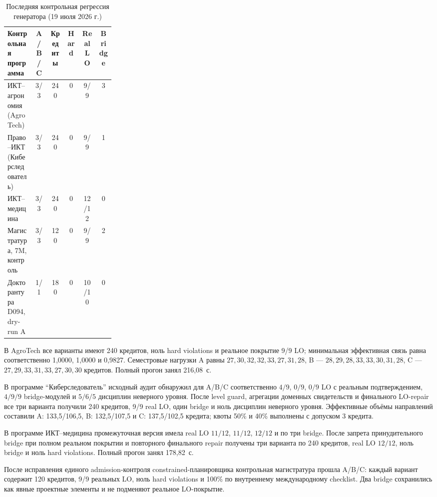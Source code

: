 \documentclass[twoside,11pt]{article}
\begin{document}
\begin{table}[H]
\centering
\caption{Последняя контрольная регрессия генератора (19 июля 2026 г.)}
\label{tab:plan-case}
\begin{tabular}{p{0.25\linewidth}ccccc}
\toprule
\textbf{Контрольная программа} & \textbf{A/B/C} & \textbf{Кредиты} & \textbf{Hard} & \textbf{Real LO} & \textbf{Bridge}\\
\midrule
ИКТ--агрономия (AgroTech) & 3/3 & 240 & 0 & 9/9 & 3\\
Право--ИКТ (Киберследователь) & 3/3 & 240 & 0 & 9/9 & 1\\
ИКТ--медицина & 3/3 & 240 & 0 & 12/12 & 0\\
Магистратура, 7M, контроль & 3/3 & 120 & 0 & 9/9 & 2\\
Докторантура D094, dry-run A & 1/1 & 180 & 0 & 10/10 & 0\\
\bottomrule
\end{tabular}
\end{table}

В AgroTech все варианты имеют 240 кредитов, ноль hard violations и реальное покрытие 9/9 LO; минимальная эффективная связь равна соответственно 1,0000, 1,0000 и 0,9827. Семестровые нагрузки A равны $27,30,32,32,33,27,31,28$, B --- $28,29,28,33,33,30,31,28$, C --- $27,29,33,31,33,27,30,30$ кредитов. Полный прогон занял 216,08~с.

В программе ``Киберследователь'' исходный аудит обнаружил для A/B/C соответственно $4/9$, $0/9$, $0/9$ LO с реальным подтверждением, $4/9/9$ bridge-модулей и $5/6/5$ дисциплин неверного уровня. После level guard, агрегации доменных свидетельств и финального LO-repair все три варианта получили 240 кредитов, 9/9 real LO, один bridge и ноль дисциплин неверного уровня. Эффективные объёмы направлений составили A: 133,5/106,5, B: 132,5/107,5 и C: 137,5/102,5 кредита; квоты 50\% и 40\% выполнены с допуском 3 кредита.

В программе ИКТ--медицина промежуточная версия имела real LO $11/12$, $11/12$, $12/12$ и по три bridge. После запрета принудительного bridge при полном реальном покрытии и повторного финального repair получены три варианта по 240 кредитов, real LO $12/12$, ноль bridge и ноль hard violations. Полный прогон занял 178,82~с.

После исправления единого admission-контроля constrained-планировщика контрольная магистратура
прошла A/B/C: каждый вариант содержит 120 кредитов, 9/9 реальных LO, ноль
hard violations и 100\% по внутреннему международному checklist. Два bridge
сохранились как явные проектные элементы и не подменяют реальное LO-покрытие.
\end{document}
